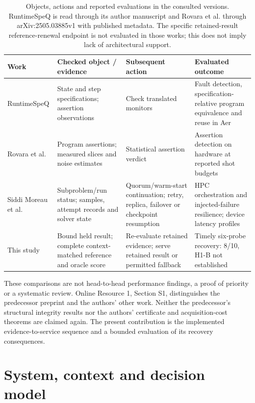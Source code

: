 \documentclass[pdflatex,sn-mathphys-num]{sn-jnl}
\begin{document}
\begin{table}[htbp]\centering\footnotesize
\begin{tabularx}{\linewidth}{p{.16\linewidth}YYY}\toprule
Work & Checked object / evidence & Subsequent action & Evaluated outcome\\\midrule
RuntimeSpeQ \cite{runtimespeq} & State and step specifications; assertion observations & Check translated monitors & Fault detection, specification-relative program equivalence and reuse in Aer\\
Rovara et al. \cite{rovara} & Program assertions; measured slices and noise estimates & Statistical assertion verdict & Assertion detection on hardware at reported shot budgets\\
Siddi Moreau et al. \cite{workflow} & Subproblem/run status; samples, attempt records and solver state & Quorum/warm-start continuation; retry, replica, failover or checkpoint resumption & HPC orchestration and injected-failure resilience; device latency profiles\\
This study & Bound held result; complete context-matched reference and oracle score & Re-evaluate retained evidence; serve retained result or permitted fallback & Timely six-probe recovery: 8/10, H1-B not established\\\bottomrule
\end{tabularx}
\caption{Objects, actions and reported evaluations in the consulted versions. RuntimeSpeQ is read through its author manuscript and Rovara et al. through arXiv:2505.03885v1 with published metadata. The specific retained-result reference-renewal endpoint is not evaluated in those works; this does not imply lack of architectural support.}\label{tab:comparison}
\end{table}

These comparisons are not head-to-head performance findings, a proof of priority or a systematic review. Online Resource 1, Section S1, distinguishes the predecessor preprint \cite{fernandez2026observational} and the authors' other work. Neither the predecessor's structural integrity results nor the authors' certificate and acquisition-cost theorems are claimed again. The present contribution is the implemented evidence-to-service sequence and a bounded evaluation of its recovery consequences.

\section{System, context and decision model}
\end{document}

